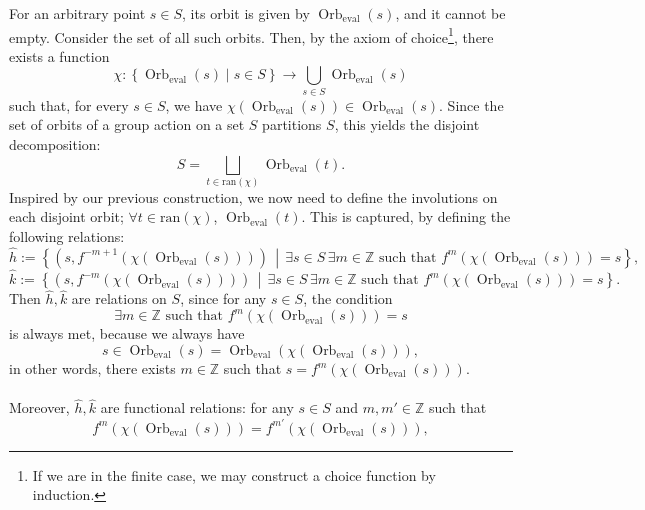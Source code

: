 \documentclass[11pt, a4paper, oneside]{article}
\theoremstyle{remark}
\theoremstyle{lemma}
\begin{document}
For an arbitrary point \( s \in S \), its orbit is given by \( \operatorname{Orb}_{\operatorname{eval}}(s) \), and it cannot be empty. Consider the set of all such orbits. Then, by the axiom of choice\footnote{If we are in the finite case, we may construct a choice function by induction.}, there exists a function
\[
\chi : \left\{ \operatorname{Orb}_{\operatorname{eval}}(s) \mid s \in S \right\} \longrightarrow \bigcup_{s \in S} \operatorname{Orb}_{\operatorname{eval}}(s)
\]
such that, for every \( s \in S \), we have \( \chi\left( \operatorname{Orb}_{\operatorname{eval}}(s) \right) \in \operatorname{Orb}_{\operatorname{eval}}(s) \). Since the set of orbits of a group action on a set \( S \) partitions \( S \), this yields the disjoint decomposition:
\[
S = \bigsqcup_{t \in \mathrm{ran}(\chi)} \operatorname{Orb}_{\operatorname{eval}}(t).
\]
Inspired by our previous construction, we now need to define the involutions on each disjoint orbit; \( \forall t \in \mathrm{ran}(\chi) \), \( \operatorname{Orb}_{\operatorname{eval}}(t) \). This is captured, by defining the following relations:
\[
\hat{h} := \left\{ \left( s, f^{-m+1}\left( \chi\left( \operatorname{Orb}_{\operatorname{eval}}\left( s \right) \right) \right) \right) \,\middle|\, \exists s \in S\,\exists m \in \mathbb{Z} \text{ such that } f^{m}\left( \chi\left( \operatorname{Orb}_{\operatorname{eval}}\left( s \right) \right) \right) = s \right\},
\]
\[
\hat{k} := \left\{ \left( s, f^{-m}\left( \chi\left( \operatorname{Orb}_{\operatorname{eval}}\left( s \right) \right) \right) \right) \,\middle|\, \exists s \in S\,\exists m \in \mathbb{Z} \text{ such that } f^{m}\left( \chi\left( \operatorname{Orb}_{\operatorname{eval}}\left( s \right) \right) \right) = s \right\}.
\]
Then \( \hat{h}, \hat{k} \) are relations on \( S \), since for any \( s \in S \), the condition 
\[
\exists m \in \mathbb{Z} \text{ such that } f^{m}\left( \chi\left( \operatorname{Orb}_{\operatorname{eval}}(s) \right) \right) = s
\]
is always met, because we always have
\[
s \in \operatorname{Orb}_{\operatorname{eval}}(s) = \operatorname{Orb}_{\operatorname{eval}}\left( \chi\left( \operatorname{Orb}_{\operatorname{eval}}(s) \right) \right),
\]
in other words, there exists \( m \in \mathbb{Z} \) such that \( s = f^{m}\left( \chi\left( \operatorname{Orb}_{\operatorname{eval}}(s) \right) \right) \).
\\\\
Moreover, \(\hat{h},\hat{k}\) are functional relations: for any \( s \in S \) and \( m, m' \in \mathbb{Z} \) such that
\[
f^{m}\left( \chi\left( \operatorname{Orb}_{\operatorname{eval}}(s) \right) \right) = f^{m'}\left( \chi\left( \operatorname{Orb}_{\operatorname{eval}}(s) \right) \right),
\]
\end{document}
